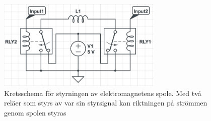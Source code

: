 \documentclass[a4paper]{article}
\begin{document}
\begin{figure}
\centering
\includegraphics[width=0.7\textwidth,keepaspectratio]{../Drawings/relay}
\caption{Kretsschema för styrningen av elektromagnetens spole. Med två reläer som styrs av var sin styrsignal kan riktningen på strömmen genom spolen styras}
\label{relay}
\end{figure}
\end{document}
